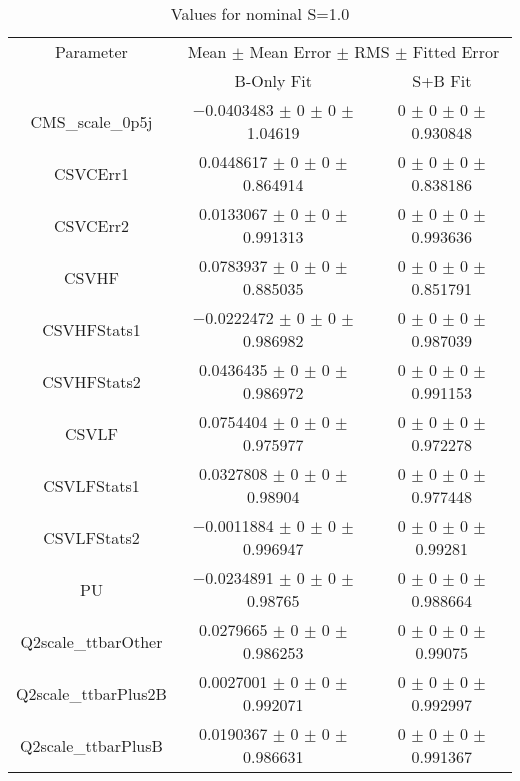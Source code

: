 \begin{table}
\centering
\caption{Values for nominal S=1.0}
\begin{tabular}{ccc}
\toprule
Parameter & \multicolumn{2}{c}{Mean $\pm$ Mean Error $\pm$ RMS $\pm$ Fitted Error}\\
 & B-Only Fit & S+B Fit\\
\midrule
CMS\_scale\_0p5j & \num{-0.0403483} $\pm$ \num{0} $\pm$ \num{0} $\pm$ \num{1.04619} & \num{0} $\pm$ \num{0} $\pm$ \num{0} $\pm$ \num{0.930848}\\
CSVCErr1 & \num{0.0448617} $\pm$ \num{0} $\pm$ \num{0} $\pm$ \num{0.864914} & \num{0} $\pm$ \num{0} $\pm$ \num{0} $\pm$ \num{0.838186}\\
CSVCErr2 & \num{0.0133067} $\pm$ \num{0} $\pm$ \num{0} $\pm$ \num{0.991313} & \num{0} $\pm$ \num{0} $\pm$ \num{0} $\pm$ \num{0.993636}\\
CSVHF & \num{0.0783937} $\pm$ \num{0} $\pm$ \num{0} $\pm$ \num{0.885035} & \num{0} $\pm$ \num{0} $\pm$ \num{0} $\pm$ \num{0.851791}\\
CSVHFStats1 & \num{-0.0222472} $\pm$ \num{0} $\pm$ \num{0} $\pm$ \num{0.986982} & \num{0} $\pm$ \num{0} $\pm$ \num{0} $\pm$ \num{0.987039}\\
CSVHFStats2 & \num{0.0436435} $\pm$ \num{0} $\pm$ \num{0} $\pm$ \num{0.986972} & \num{0} $\pm$ \num{0} $\pm$ \num{0} $\pm$ \num{0.991153}\\
CSVLF & \num{0.0754404} $\pm$ \num{0} $\pm$ \num{0} $\pm$ \num{0.975977} & \num{0} $\pm$ \num{0} $\pm$ \num{0} $\pm$ \num{0.972278}\\
CSVLFStats1 & \num{0.0327808} $\pm$ \num{0} $\pm$ \num{0} $\pm$ \num{0.98904} & \num{0} $\pm$ \num{0} $\pm$ \num{0} $\pm$ \num{0.977448}\\
CSVLFStats2 & \num{-0.0011884} $\pm$ \num{0} $\pm$ \num{0} $\pm$ \num{0.996947} & \num{0} $\pm$ \num{0} $\pm$ \num{0} $\pm$ \num{0.99281}\\
PU & \num{-0.0234891} $\pm$ \num{0} $\pm$ \num{0} $\pm$ \num{0.98765} & \num{0} $\pm$ \num{0} $\pm$ \num{0} $\pm$ \num{0.988664}\\
Q2scale\_ttbarOther & \num{0.0279665} $\pm$ \num{0} $\pm$ \num{0} $\pm$ \num{0.986253} & \num{0} $\pm$ \num{0} $\pm$ \num{0} $\pm$ \num{0.99075}\\
Q2scale\_ttbarPlus2B & \num{0.0027001} $\pm$ \num{0} $\pm$ \num{0} $\pm$ \num{0.992071} & \num{0} $\pm$ \num{0} $\pm$ \num{0} $\pm$ \num{0.992997}\\
Q2scale\_ttbarPlusB & \num{0.0190367} $\pm$ \num{0} $\pm$ \num{0} $\pm$ \num{0.986631} & \num{0} $\pm$ \num{0} $\pm$ \num{0} $\pm$ \num{0.991367}\\

\end{tabular}
\end{table}
